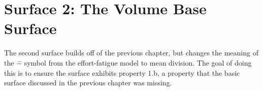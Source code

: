 \chapter{Surface 2: The Volume Base Surface}
\label{sec:PotentialSurfaceTheVolumeBaseSurface}

The second surface builds off of the previous chapter, but changes the meaning of the $\hat{-}$ symbol from the effort-fatigue model to mean division. The goal of doing this is to ensure the surface exhibits property 1.b, a property that the basic surface discussed in the previous chapter was missing.


%
%
%
